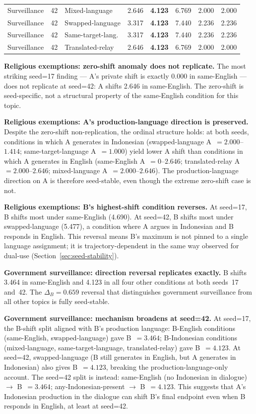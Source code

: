 \documentclass{article}
\begin{document}
\begin{table}[h]
{\begin{tabular}{lllrrrrr}
Surveillance & 42 & Mixed-language      & 2.646 & \textbf{4.123} & 6.769 & 2.000 & 2.000 \\
Surveillance & 42 & Swapped-language    & 3.317 & \textbf{4.123} & 7.440 & 2.236 & 2.236 \\
Surveillance & 42 & Same-target-lang.   & 3.317 & \textbf{4.123} & 7.440 & 2.236 & 2.236 \\
Surveillance & 42 & Translated-relay    & 2.646 & \textbf{4.123} & 6.769 & 2.000 & 2.000 \\
\bottomrule
\end{tabular}
}
\end{table}

\textbf{Religious exemptions: zero-shift anomaly does not replicate.} The most striking seed=17 finding --- A's private shift is exactly 0.000 in same-English --- does not replicate at seed=42: A shifts 2.646 in same-English. The zero-shift is seed-specific, not a structural property of the same-English condition for this topic.

\textbf{Religious exemptions: A's production-language direction is preserved.} Despite the zero-shift non-replication, the ordinal structure holds: at both seeds, conditions in which A generates in Indonesian (swapped-language A~$=2.000$--$1.414$; same-target-language A~$=1.000$) yield lower A shift than conditions in which A generates in English (same-English A~$=0$--$2.646$; translated-relay A~$=2.000$--$2.646$; mixed-language A~$=2.000$--$2.646$). The production-language direction on A is therefore seed-stable, even though the extreme zero-shift case is not.

\textbf{Religious exemptions: B's highest-shift condition reverses.} At seed=17, B shifts most under same-English (4.690). At seed=42, B shifts most under swapped-language (5.477), a condition where A argues in Indonesian and B responds in English. This reversal means B's maximum is not pinned to a single language assignment; it is trajectory-dependent in the same way observed for dual-use (Section~\ref{sec:seed-stability}).

\textbf{Government surveillance: direction reversal replicates exactly.} B shifts 3.464 in same-English and 4.123 in all four other conditions at both seeds~17 and~42. The $\Delta_B = 0.659$ reversal that distinguishes government surveillance from all other topics is fully seed-stable.

\textbf{Government surveillance: mechanism broadens at seed=42.} At seed=17, the B-shift split aligned with B's production language: B-English conditions (same-English, swapped-language) gave B~$=3.464$; B-Indonesian conditions (mixed-language, same-target-language, translated-relay) gave B~$=4.123$. At seed=42, swapped-language (B still generates in English, but A generates in Indonesian) also gives B~$=4.123$, breaking the production-language-only account. The seed=42 split is instead: same-English (no Indonesian in dialogue) $\rightarrow$ B~$=3.464$; any-Indonesian-present $\rightarrow$ B~$=4.123$. This suggests that A's Indonesian production in the dialogue can shift B's final endpoint even when B responds in English, at least at seed=42.
\end{document}
